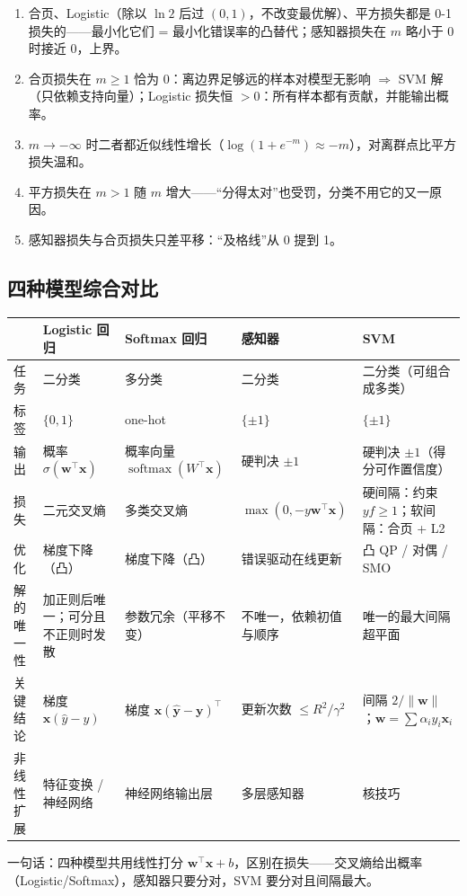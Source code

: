 \begin{minipage}[t]{0.56\linewidth}\vspace{0pt}\small
\begin{enumerate}
\item 合页、Logistic（除以 $\ln2$ 后过 $(0,1)$，不改变最优解）、平方损失都是 0-1 损失的——最小化它们 = 最小化错误率的凸替代；感知器损失在 $m$ 略小于 0 时接近 0，上界。
\item 合页损失在 $m\ge1$ 恰为 0：离边界足够远的样本对模型无影响 $\Rightarrow$ SVM 解（只依赖支持向量）；Logistic 损失恒 $>0$：所有样本都有贡献，并能输出概率。
\item $m\to-\infty$ 时二者都近似线性增长（$\log(1+e^{-m})\approx-m$），对离群点比平方损失温和。
\item 平方损失在 $m>1$ 随 $m$ 增大——“分得太对”也受罚，分类不用它的又一原因。
\item 感知器损失与合页损失只差平移：“及格线”从 0 提到 1。
\end{enumerate}
\end{minipage}

\subsection{四种模型综合对比}
\begin{center}\small
\begin{tabularx}{\linewidth}{@{}p{1.75cm}LLLL@{}}
\toprule
 & Logistic 回归 & Softmax 回归 & 感知器 & SVM \\
\midrule
任务 & 二分类 & 多分类 & 二分类 & 二分类（可组合成多类） \\
标签 & $\{0,1\}$ & one-hot & $\{\pm1\}$ & $\{\pm1\}$ \\
输出 & 概率 $\sigma(\bm w^\top\bm x)$ & 概率向量 $\operatorname{softmax}(W^\top\bm x)$ & 硬判决 $\pm1$ & 硬判决 $\pm1$（得分可作置信度） \\
损失 & 二元交叉熵 & 多类交叉熵 & $\max(0,-y\bm w^\top\bm x)$ & 硬间隔：约束 $yf\ge1$；软间隔：合页 + L2 \\
优化 & 梯度下降（凸） & 梯度下降（凸） & 错误驱动在线更新 & 凸 QP / 对偶 / SMO \\
解的唯一性 & 加正则后唯一；可分且不正则时发散 & 参数冗余（平移不变） & 不唯一，依赖初值与顺序 & 唯一的最大间隔超平面 \\
关键结论 & 梯度 $\bm x(\hat y-y)$ & 梯度 $\bm x(\hat{\bm y}-\bm y)^\top$ & 更新次数 $\le R^2/\gamma^2$ & 间隔 $2/\|\bm w\|$；$\bm w=\sum\alpha_iy_i\bm x_i$ \\
非线性扩展 & 特征变换 / 神经网络 & 神经网络输出层 & 多层感知器 & 核技巧 \\
\bottomrule
\end{tabularx}
\end{center}
一句话：四种模型共用线性打分 $\bm w^\top\bm x+b$，区别在损失——交叉熵给出概率（Logistic/Softmax），感知器只要分对，SVM 要分对且间隔最大。


